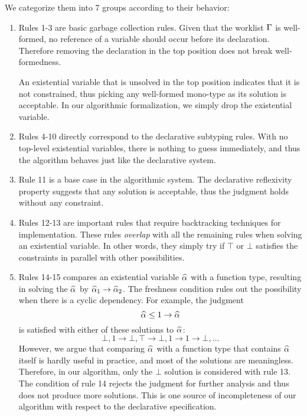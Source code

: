 We categorize them into 7 groups according to their behavior:
\begin{enumerate}
    \item Rules 1-3 are basic garbage collection rules.
        Given that the worklist $\Gamma$ is well-formed,
        no reference of a variable should occur before its declaration.
        Therefore removing the declaration in the top position does not break well-formedness.

        An existential variable that is unsolved in the top position indicates
        that it is not constrained,
        thus picking any well-formed mono-type as its solution is acceptable.
        In our algorithmic formalization, we simply drop the existential variable.

    \item Rules 4-10 directly correspond to the declarative subtyping rules.
        With no top-level existential variables,
        there is nothing to guess immediately,
        and thus the algorithm behaves just like the declarative system.

    \item Rule 11 is a base case in the algorithmic system.
        The declarative reflexivity property suggests that any solution is acceptable,
        thus the judgment holds without any constraint.
    
    \item Rules 12-13 are important rules that require backtracking techniques
        for implementation.
        These rules \emph{overlap} with all the remaining rules when solving
        an existential variable.
        In other words, they simply try if $\top$ or $\bot$ satisfies the constraints
        in parallel with other possibilities.
    
    \item Rules 14-15 compares an existential variable $\al$ with a function type,
        resulting in solving the $\al$ by $\al[1] \to \al[2]$.
        The freshness condition rules out the possibility
        when there is a cyclic dependency.
        For example, the judgment
        \[\al \le 1 \to \al\]
        is satisfied with either of these solutions to $\al$:
        \[ \bot, 1 \to \bot, \top \to \bot, 1 \to 1 \to \bot, \ldots \]
        However, we argue that comparing $\al$ with a function type
        that contains $\al$ itself is hardly useful in practice,
        and most of the solutions are meaningless.
        Therefore, in our algorithm, only the $\bot$ solution is considered
        with rule 13.
        The condition of rule 14 rejects the judgment for further analysis
        and thus does not produce more solutions.
        This is one source of incompleteness of our algorithm with respect to the declarative specification.
    

\end{enumerate}
